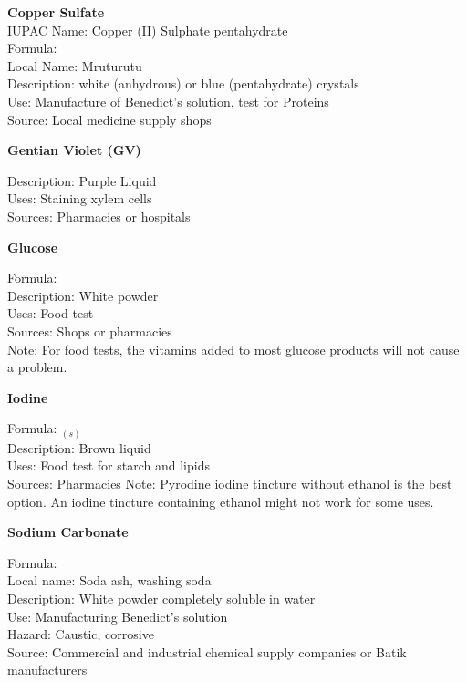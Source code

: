 \begin{flushleft}
\textbf{Copper Sulfate}\\
IUPAC Name: Copper (II) Sulphate pentahydrate\\
Formula: \\
Local Name: Mruturutu\\
Description: white (anhydrous) or blue (pentahydrate) crystals\\
Use: Manufacture of Benedict's solution, test for Proteins\\
Source: Local medicine supply shops\\

\begin{flushleft}
\textbf{Gentian Violet (GV)}
\end{flushleft}
\vspace{-10pt}
Description: Purple Liquid\\
Uses: Staining xylem cells\\
Sources: Pharmacies or hospitals\\

\begin{flushleft}
\textbf{Glucose}
\end{flushleft}
\vspace{-10pt}
Formula: \\
Description: White powder\\
Uses: Food test\\
Sources: Shops or pharmacies\\
Note: For food tests, the vitamins added to most glucose products will not cause
a problem.

\begin{flushleft}
\textbf{Iodine}
\end{flushleft}
\vspace{-10pt}
Formula: $_{(s)}$\\
Description: Brown liquid\\
Uses: Food test for starch and lipids\\
Sources: Pharmacies
Note: Pyrodine iodine tincture without ethanol is the best option. An iodine tincture containing ethanol might not work for some uses.

\begin{flushleft}
\textbf{Sodium Carbonate}
\end{flushleft}
\vspace{-10pt}
Formula: \\
Local name: Soda ash, washing soda\\
Description: White powder completely soluble in water\\
Use: Manufacturing Benedict's solution\\
Hazard: Caustic, corrosive\\
Source: Commercial and industrial chemical supply companies or Batik manufacturers\\


\end{flushleft}
